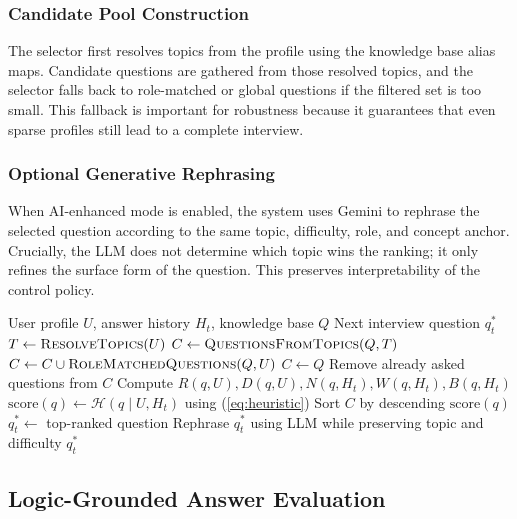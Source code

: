 \documentclass[conference]{IEEEtran}
\begin{document}
\subsubsection{Candidate Pool Construction}
The selector first resolves topics from the profile using the knowledge base alias maps. Candidate questions are gathered from those resolved topics, and the selector falls back to role-matched or global questions if the filtered set is too small. This fallback is important for robustness because it guarantees that even sparse profiles still lead to a complete interview.

\subsubsection{Optional Generative Rephrasing}
When AI-enhanced mode is enabled, the system uses Gemini to rephrase the selected question according to the same topic, difficulty, role, and concept anchor. Crucially, the LLM does not determine which topic wins the ranking; it only refines the surface form of the question. This preserves interpretability of the control policy.

\begin{algorithm}[t]
\caption{Adaptive Next-Question Selection}
\label{alg:selection}
\begin{algorithmic}[1]
\Require User profile $U$, answer history $H_t$, knowledge base $Q$
\Ensure Next interview question $q_t^*$
\State $T \gets \textsc{ResolveTopics}(U)$
\State $C \gets \textsc{QuestionsFromTopics}(Q, T)$
    \State $C \gets C \cup \textsc{RoleMatchedQuestions}(Q, U)$
\EndIf
{}
    \State $C \gets Q$
\EndIf
\State Remove already asked questions from $C$
    \State Compute $R(q,U), D(q,U), N(q,H_t), W(q,H_t), B(q,H_t)$
    \State $\mathrm{score}(q) \gets \mathcal{H}(q \mid U, H_t)$ using (\ref{eq:heuristic})
\EndFor
\State Sort $C$ by descending $\mathrm{score}(q)$
\State $q_t^* \gets$ top-ranked question
    \State Rephrase $q_t^*$ using LLM while preserving topic and difficulty
\EndIf
\State \Return $q_t^*$
\end{algorithmic}
\end{algorithm}

\subsection{Logic-Grounded Answer Evaluation}
\end{document}
